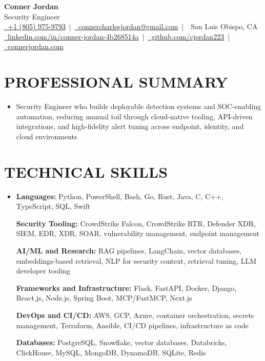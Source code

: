 \documentclass[letterpaper,10pt]{article}
\newcommand{\resumeSubHeadingListStart}{\begin{itemize}[leftmargin=0in,label={}]}
\newcommand{\resumeSubHeadingListEnd}{\end{itemize}}
\begin{document}
\begin{center}
  {\Huge \textbf{Conner Jordan}}\\[0pt]
  {\Large Security Engineer}\\[0pt]
  \href{tel:+18059759793}{\faPhone\ +1 (805) 975-9793} \,|\, 
  \href{mailto:connercharlesjordan@gmail.com}{\faEnvelope\ connercharlesjordan@gmail.com} \,|\, 
  \faMapMarker\ San Luis Obispo, CA \\[-2pt]
  \href{https://www.linkedin.com/in/conner-jordan-4b268514a/}{\faLinkedin\ linkedin.com/in/conner-jordan-4b268514a}
  \,|\, \href{https://github.com/cjordan223}{\faGithub\ github.com/cjordan223}
  \,|\, \href{https://connerjordan.com/}{\faGlobe\ connerjordan.com}
\end{center}

\vspace{4pt}

\section{PROFESSIONAL SUMMARY}
\vspace{8pt}
\resumeSubHeadingListStart
\item {\small
Security Engineer who builds deployable detection systems and SOC-enabling automation, reducing manual toil through cloud-native tooling, API-driven integrations, and high-fidelity alert tuning across endpoint, identity, and cloud environments}
\resumeSubHeadingListEnd
\vspace{6pt}

\section{TECHNICAL SKILLS}
\vspace{6pt}
\resumeSubHeadingListStart
\item {\small
\textbf{Languages:} Python, PowerShell, Bash, Go, Rust, Java, C, C++, TypeScript, SQL, Swift

\vspace{3pt}
\textbf{Security Tooling:} CrowdStrike Falcon, CrowdStrike RTR, Defender XDR, SIEM, EDR, XDR, SOAR, vulnerability management, endpoint management

\vspace{3pt}
\textbf{AI/ML and Research:} RAG pipelines, LangChain, vector databases, embeddings-based retrieval, NLP for security context, retrieval tuning, LLM developer tooling

\vspace{3pt}
\textbf{Frameworks and Infrastructure:} Flask, FastAPI, Docker, Django, React.js, Node.js, Spring Boot, MCP/FastMCP, Next.js

\vspace{3pt}
\textbf{DevOps and CI/CD:} AWS, GCP, Azure, container orchestration, secrets management, Terraform, Ansible, CI/CD pipelines, infrastructure as code

\vspace{3pt}
\textbf{Databases:} PostgreSQL, Snowflake, vector databases, Databricks, ClickHouse, MySQL, MongoDB, DynamoDB, SQLite, Redis
}
\resumeSubHeadingListEnd
\vspace{6pt}
\end{document}
